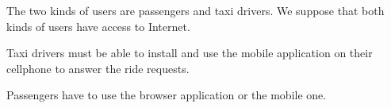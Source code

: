 The two kinds of users are passengers and taxi drivers.
We suppose that both kinds of users have access to Internet.

Taxi drivers must be able to install and use the mobile application on their cellphone to answer the ride requests. 

Passengers have to use the browser application or the mobile one.


